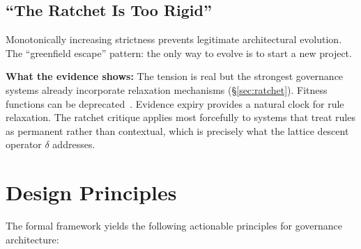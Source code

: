 \documentclass[11pt, a4paper, logo, copyright]{googledeepmind}
\begin{document}
\subsection{``The Ratchet Is Too Rigid''}

Monotonically increasing strictness prevents legitimate architectural evolution. The ``greenfield escape'' pattern: the only way to evolve is to start a new project.

\textbf{What the evidence shows:} The tension is real but the strongest governance systems already incorporate relaxation mechanisms (\S\ref{sec:ratchet}). Fitness functions can be deprecated~\citep{ford2017}. Evidence expiry provides a natural clock for rule relaxation. The ratchet critique applies most forcefully to systems that treat rules as permanent rather than contextual, which is precisely what the lattice descent operator $\delta$ addresses.


\section{Design Principles}
\label{sec:principles}

The formal framework yields the following actionable principles for governance architecture:
\end{document}
